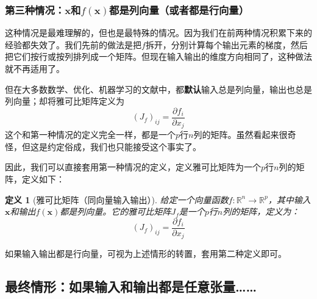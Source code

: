 \documentclass[
    UTF8,
    a4paper,
    12pt
]{ctexart}
\newtheorem{definition}{定义}
\begin{document}
\subsubsection{第三种情况：$\mathbf{x}$和$f(\mathbf{x})$都是列向量（或者都是行向量）}

这种情况是最难理解的，但也是最特殊的情况。因为我们在前两种情况积累下来的经验都失效了。我们先前的做法是把$f$拆开，分别计算每个输出元素的梯度，然后把它们按行或按列排列成一个矩阵。但现在输入输出的维度方向相同了，这种做法就不再适用了。

但在大多数数学、优化、机器学习的文献中，都\textbf{默认}输入总是列向量，输出也总是列向量；却将雅可比矩阵定义为
\begin{equation}
    (J_f)_{ij} = \frac{\partial f_i}{\partial x_j}
\end{equation}
这个和第一种情况的定义完全一样，都是一个$p$行$n$列的矩阵。虽然看起来很奇怪，但这是约定俗成，我们也只能接受这个事实了。

因此，我们可以直接套用第一种情况的定义，定义雅可比矩阵为一个$p$行$n$列的矩阵，定义如下：
\begin{definition}[雅可比矩阵（同向量输入输出）]
    给定一个向量函数$f: \mathbb{R}^n \to \mathbb{R}^p$，其中输入$\mathbf{x}$和输出$f(\mathbf{x})$都是列向量。它的雅可比矩阵$J_f$是一个$p$行$n$列的矩阵，定义为：
    \begin{equation}
        (J_f)_{ij} = \frac{\partial f_i}{\partial x_j}
    \end{equation}
\end{definition}
如果输入输出都是行向量，可视为上述情形的转置，套用第二种定义即可。

\subsection{最终情形：如果输入和输出都是任意张量……}
\end{document}
